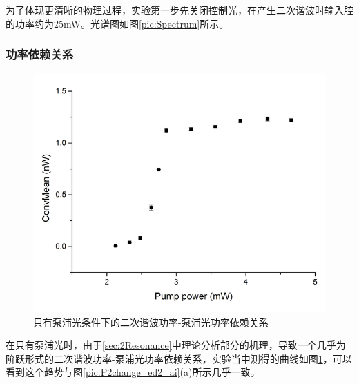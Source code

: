 \documentclass[UTF8,a4paper,cs4size,hyperref]{ctexart}
\begin{document}
为了体现更清晰的物理过程，实验第一步先关闭控制光，在产生二次谐波时输入腔的功率约为25mW。光谱图如图\ref{pic:Spectrum}所示。

\subsubsection{功率依赖关系}

\begin{figure}
\centering
\includegraphics[width=14cm ]{SimpPWDP.png}
\caption{只有泵浦光条件下的二次谐波功率-泵浦光功率依赖关系}
\label{pic:SimpPWDP}
\end{figure}

在只有泵浦光时，由于\ref{sec:2Resonance}中理论分析部分的机理，导致一个几乎为阶跃形式的二次谐波功率-泵浦光功率依赖关系，实验当中测得的曲线如图\ref{pic:SimpPWDP}，可以看到这个趋势与图\ref{pic:P2change_ed2_ai}(a)所示几乎一致。






\newpage

\end{document}
